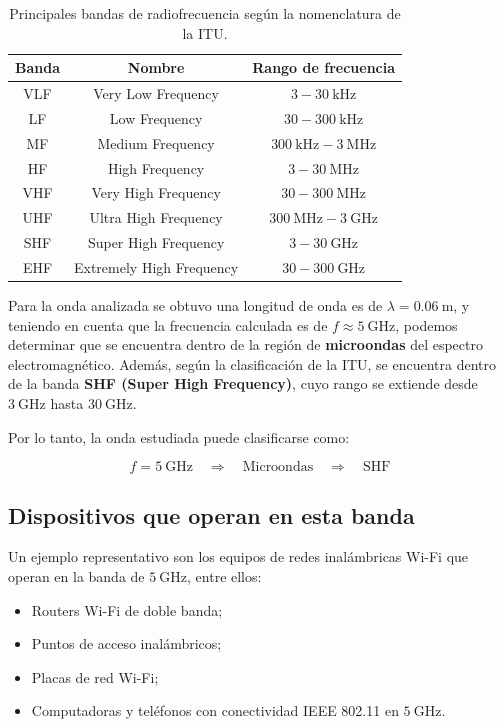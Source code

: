 ﻿\documentclass[12pt,a4paper]{article}
\begin{document}
\begin{table}[H]
\centering
\begin{tabular}{c c c}
\hline
\textbf{Banda} & \textbf{Nombre} & \textbf{Rango de frecuencia} \\
\hline
VLF & Very Low Frequency & $3 - 30\ \text{kHz}$ \\
LF  & Low Frequency & $30 - 300\ \text{kHz}$ \\
MF  & Medium Frequency & $300\ \text{kHz} - 3\ \text{MHz}$ \\
HF  & High Frequency & $3 - 30\ \text{MHz}$ \\
VHF & Very High Frequency & $30 - 300\ \text{MHz}$ \\
UHF & Ultra High Frequency & $300\ \text{MHz} - 3\ \text{GHz}$ \\
SHF & Super High Frequency & $3 - 30\ \text{GHz}$ \\
EHF & Extremely High Frequency & $30 - 300\ \text{GHz}$ \\
\hline
\end{tabular}
\caption{Principales bandas de radiofrecuencia según la nomenclatura de la ITU.}
\end{table}

Para la onda analizada se obtuvo una longitud de onda es de \( \lambda = 0.06\ \text{m} \), y teniendo en
cuenta que la frecuencia calculada es de \( f \approx 5\ \text{GHz} \), podemos determinar que se encuentra
dentro de la región de \textbf{microondas} del espectro electromagnético. Además, según la
clasificación de la ITU, se encuentra dentro de la banda
\textbf{SHF (Super High Frequency)}, cuyo rango se extiende desde
$3\ \text{GHz}$ hasta $30\ \text{GHz}$.

Por lo tanto, la onda estudiada puede clasificarse como:

\begin{equation}
    \boxed{f = 5\ \text{GHz}
    \quad \Rightarrow \quad
    \text{Microondas} \quad \Rightarrow \quad \text{SHF}}
\end{equation}

\subsection{Dispositivos que operan en esta banda}

Un ejemplo representativo son los equipos de redes inalámbricas Wi-Fi que
operan en la banda de $5\ \mathrm{GHz}$, entre ellos:

\begin{itemize}
  \item Routers Wi-Fi de doble banda;
  \item Puntos de acceso inalámbricos;
  \item Placas de red Wi-Fi;
  \item Computadoras y teléfonos con conectividad IEEE 802.11 en $5\ \mathrm{GHz}$.
\end{itemize}
\end{document}
